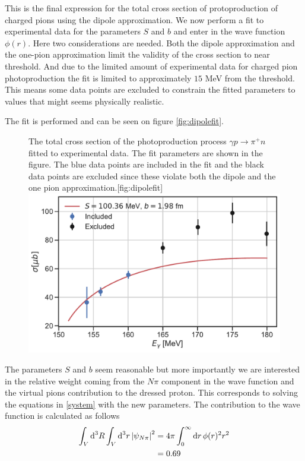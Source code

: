 This is the final expression for the total cross section of protoproduction of charged pions using the dipole approximation. We now perform a fit to experimental data for the parameters $S$ and $b$ and enter in the wave function $\phi(r)$. Here two considerations are needed. Both the dipole approximation and the one-pion approximation limit the validity of the cross section to near threshold. And due to the limited amount of experimental data for charged pion photoproduction the fit is limited to approximately $15$ MeV from the threshold. This means some data points are excluded to constrain the fitted parameters to values that might seems physically realistic. 

The fit is performed and can be seen on figure \ref{fig:dipolefit}.
\begin{figure}[H]
    \begin{sidecaption}{The total cross section of the photoproduction process $\gamma p \rightarrow \pi^+ n$ fitted to experimental data. The fit parameters are shown in the figure. The blue data points are included in the fit and the black data points are excluded since these violate both the dipole and the one pion approximation.}[fig:dipolefit]
    \includegraphics[width=\linewidth]{Figures/dipole_approximation.pdf}
    \end{sidecaption}
\end{figure}
The parameters $S$ and $b$ seem reasonable but more importantly we are interested in the relative weight coming from the $N\pi$ component in the wave function and the virtual pions contribution to the dressed proton. This corresponds to solving the equations in \eqref{system} with the new parameters. The contribution to the wave function is calculated as follows
\begin{align}
    \int_V \text{d}^3R \int_V \text{d}^3 r \, \abs{\psi_{N\pi}}^2 &= 4\pi \int_0^\infty \text{d}r \, \phi(r)^2r^2 \\
    &= 0.69
\end{align}
